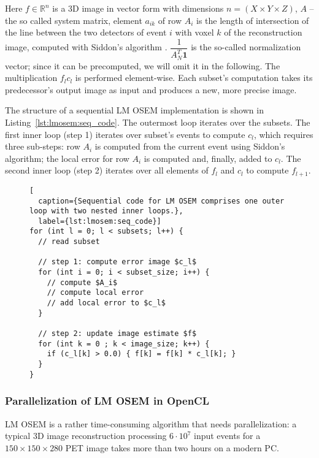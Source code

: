 Here $f \in \mathbb{R}^n$ is a 3D image in vector form with dimensions $n = (X \times Y \times Z)$, $A$ -- the so called system matrix, element $a_{ik}$ of row $A_i$ is the length of intersection of the line between the two detectors of event $i$ with voxel $k$ of the reconstruction image, computed with Siddon's algorithm \cite{Siddon1985}.
$\dfrac{1}{A_N^T \textbf{1}}$ is the so-called normalization vector; since it can be precomputed, we will omit it in the following.
The multiplication $f_{l}c_{l}$ is performed element-wise.
Each subset's computation takes its predecessor's output image as input and produces a new, more precise image.

The structure of a sequential LM OSEM implementation is shown in Listing~\ref{lst:lmosem:seq_code}.
The outermost loop iterates over the subsets.
The first inner loop (step 1) iterates over subset's events to compute $c_l$, which requires three sub-steps:
row $A_i$ is computed from the current event using Siddon's algorithm;
the local error for row $A_i$ is computed and, finally, added to $c_l$.
The second inner loop (step 2) iterates over all elements of $f_l$ and $c_l$ to compute $f_{l+1}$.
\begin{figure}
\begin{lstlisting}[
  caption={Sequential code for LM OSEM comprises one outer loop with two nested inner loops.},
  label={lst:lmosem:seq_code}]
for (int l = 0; l < subsets; l++) {
  // read subset

  // step 1: compute error image $c_l$
  for (int i = 0; i < subset_size; i++) {
    // compute $A_i$
    // compute local error
    // add local error to $c_l$
  }

  // step 2: update image estimate $f$
  for (int k = 0 ; k < image_size; k++) {
    if (c_l[k] > 0.0) { f[k] = f[k] * c_l[k]; }
  }
}
\end{lstlisting}
\end{figure}

\subsubsection{Parallelization of LM OSEM in OpenCL}
\label{sec:parallel_implementation}
LM OSEM is a rather time-consuming algorithm that needs parallelization:
a typical 3D image reconstruction processing $6 \cdot 10^7$ input events for a $150 \times 150 \times 280$ PET image takes more than two hours on a modern PC.

